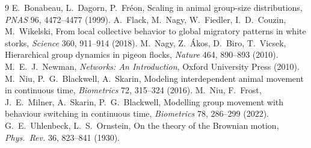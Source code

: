 \documentclass[10pt,a4paper]{article}
\begin{document}
\begin{thebibliography}{9}\small
{} E.~Bonabeau, L.~Dagorn, P.~Fr\'eon, Scaling in animal group-size distributions,
  \emph{PNAS} 96, 4472--4477 (1999).
 A.~Flack, M.~Nagy, W.~Fiedler, I.~D.~Couzin, M.~Wikelski, From local collective behavior
  to global migratory patterns in white storks, \emph{Science} 360, 911--914 (2018).
 M.~Nagy, Z.~\'Akos, D.~Biro, T.~Vicsek, Hierarchical group dynamics in pigeon flocks,
  \emph{Nature} 464, 890--893 (2010).
 M.~E.~J.~Newman, \emph{Networks: An Introduction}, Oxford University Press (2010).
 M.~Niu, P.~G.~Blackwell, A.~Skarin, Modeling interdependent animal movement in continuous
  time, \emph{Biometrics} 72, 315--324 (2016).
 M.~Niu, F.~Frost, J.~E.~Milner, A.~Skarin, P.~G.~Blackwell, Modelling group movement with
  behaviour switching in continuous time, \emph{Biometrics} 78, 286--299 (2022).
 G.~E.~Uhlenbeck, L.~S.~Ornstein, On the theory of the Brownian motion,
  \emph{Phys.\ Rev.} 36, 823--841 (1930).
\end{thebibliography}

\appendix

\end{document}

